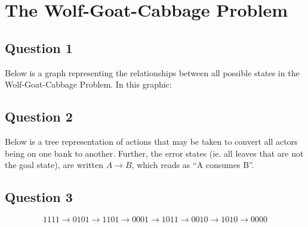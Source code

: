 \section{The Wolf-Goat-Cabbage Problem}

  \subsection{Question 1}

    Below is a graph representing the relationships between all possible states
    in the Wolf-Goat-Cabbage Problem. In this graphic:

    \bigskip
    \bigskip
    

  \subsection{Question 2}

  Below is a tree representation of actions that may be taken to convert all
  actors being on one bank to another. Further, the error states (ie. all leaves that
  are not the goal state), are written $A \rightarrow B$, which reads as ``A
  consumes B''.

    \bigskip

    

  \subsection{Question 3}

    \bigskip

    $$1111 \rightarrow 0101 \rightarrow 1101 \rightarrow 0001 \rightarrow 1011
    \rightarrow 0010 \rightarrow 1010 \rightarrow 0000$$
